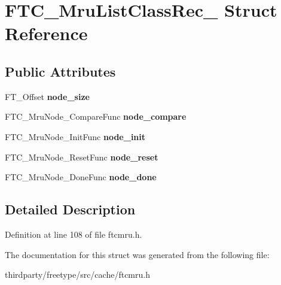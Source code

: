 \hypertarget{struct_f_t_c___mru_list_class_rec__}{}\section{F\+T\+C\+\_\+\+Mru\+List\+Class\+Rec\+\_\+ Struct Reference}
\label{struct_f_t_c___mru_list_class_rec__}
\subsection*{Public Attributes}
\begin{DoxyCompactItemize}
\item 
\mbox{\label{struct_f_t_c___mru_list_class_rec___ad2fbb0154f56c762aedd3993ec70b3f8}} 
F\+T\+\_\+\+Offset {\bfseries node\+\_\+size}
\item 
\mbox{\label{struct_f_t_c___mru_list_class_rec___ac6e2ce3551a013d0265673ba113ad62a}} 
F\+T\+C\+\_\+\+Mru\+Node\+\_\+\+Compare\+Func {\bfseries node\+\_\+compare}
\item 
\mbox{\label{struct_f_t_c___mru_list_class_rec___a167b0882d1c55f78f35059e150212d82}} 
F\+T\+C\+\_\+\+Mru\+Node\+\_\+\+Init\+Func {\bfseries node\+\_\+init}
\item 
\mbox{\label{struct_f_t_c___mru_list_class_rec___ab4a9d2bb62f972f72f72755c32652c8c}} 
F\+T\+C\+\_\+\+Mru\+Node\+\_\+\+Reset\+Func {\bfseries node\+\_\+reset}
\item 
\mbox{\label{struct_f_t_c___mru_list_class_rec___a85482f5a96f6e7ecb28dfbe03873c9ea}} 
F\+T\+C\+\_\+\+Mru\+Node\+\_\+\+Done\+Func {\bfseries node\+\_\+done}
\end{DoxyCompactItemize}


\subsection{Detailed Description}


Definition at line 108 of file ftcmru.\+h.



The documentation for this struct was generated from the following file\+:\begin{DoxyCompactItemize}
\item 
thirdparty/freetype/src/cache/ftcmru.\+h\end{DoxyCompactItemize}
